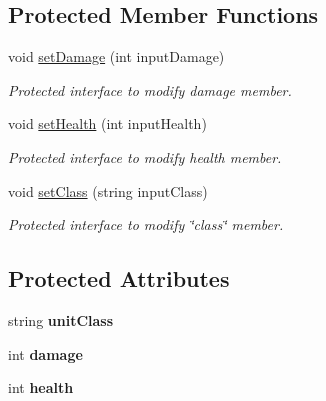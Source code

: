 \subsection*{Protected Member Functions}
\begin{DoxyCompactItemize}
\item 
\hypertarget{class_unit_ac57bb8bbddb45b4b55f841e43f96fe0b}{}void \hyperlink{class_unit_ac57bb8bbddb45b4b55f841e43f96fe0b}{set\+Damage} (int input\+Damage)\label{class_unit_ac57bb8bbddb45b4b55f841e43f96fe0b}

\begin{DoxyCompactList}\small\item\em Protected interface to modify damage member. \end{DoxyCompactList}\item 
\hypertarget{class_unit_ac763191e46e663938479a9be72c5bd39}{}void \hyperlink{class_unit_ac763191e46e663938479a9be72c5bd39}{set\+Health} (int input\+Health)\label{class_unit_ac763191e46e663938479a9be72c5bd39}

\begin{DoxyCompactList}\small\item\em Protected interface to modify health member. \end{DoxyCompactList}\item 
\hypertarget{class_unit_a0da561786edca63a3282b60a1203ef61}{}void \hyperlink{class_unit_a0da561786edca63a3282b60a1203ef61}{set\+Class} (string input\+Class)\label{class_unit_a0da561786edca63a3282b60a1203ef61}

\begin{DoxyCompactList}\small\item\em Protected interface to modify \char`\"{}class\char`\"{} member. \end{DoxyCompactList}\end{DoxyCompactItemize}
\subsection*{Protected Attributes}
\begin{DoxyCompactItemize}
\item 
\hypertarget{class_unit_a0d8686cf27c3054dff4d0961cb3142d6}{}string {\bfseries unit\+Class}\label{class_unit_a0d8686cf27c3054dff4d0961cb3142d6}

\item 
\hypertarget{class_unit_a92bfb1430ab13e69d4c703a7fc8bafdb}{}int {\bfseries damage}\label{class_unit_a92bfb1430ab13e69d4c703a7fc8bafdb}

\item 
\hypertarget{class_unit_aa0d11313f047316fc48c7b523d2fc206}{}int {\bfseries health}\label{class_unit_aa0d11313f047316fc48c7b523d2fc206}

\end{DoxyCompactItemize}
